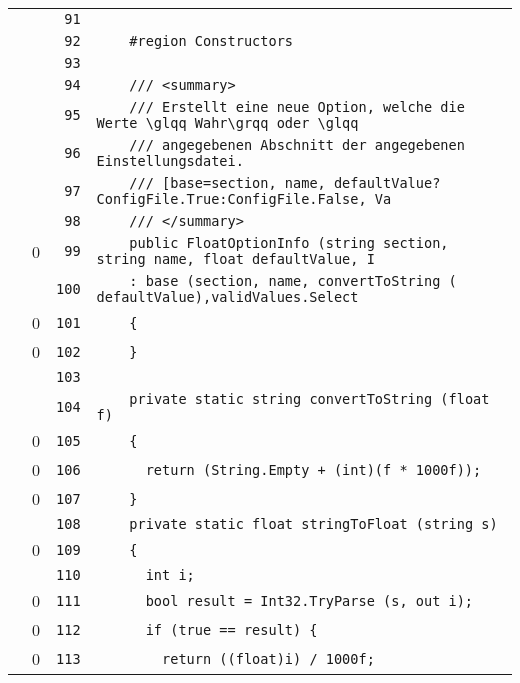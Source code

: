 \documentclass[a4paper,10pt]{article}
\begin{document}
\begin{longtable}[l]{lrrl}
\cellcolor{gray} &  & \verb~91~ & \verb~~\\
\cellcolor{gray} &  & \verb~92~ & \verb~    #region Constructors~\\
\cellcolor{gray} &  & \verb~93~ & \verb~~\\
\cellcolor{gray} &  & \verb~94~ & \verb~    /// <summary>~\\
\cellcolor{gray} &  & \verb~95~ & \verb~    /// Erstellt eine neue Option, welche die Werte \glqq Wahr\grqq oder \glqq~\\
\cellcolor{gray} &  & \verb~96~ & \verb~    /// angegebenen Abschnitt der angegebenen Einstellungsdatei.~\\
\cellcolor{gray} &  & \verb~97~ & \verb~    /// [base=section, name, defaultValue?ConfigFile.True:ConfigFile.False, Va~\\
\cellcolor{gray} &  & \verb~98~ & \verb~    /// </summary>~\\
\cellcolor{red} & 0 & \verb~99~ & \verb~    public FloatOptionInfo (string section, string name, float defaultValue, I~\\
\cellcolor{gray} &  & \verb~100~ & \verb~    : base (section, name, convertToString ( defaultValue),validValues.Select ~\\
\cellcolor{red} & 0 & \verb~101~ & \verb~    {~\\
\cellcolor{red} & 0 & \verb~102~ & \verb~    }~\\
\cellcolor{gray} &  & \verb~103~ & \verb~~\\
\cellcolor{gray} &  & \verb~104~ & \verb~    private static string convertToString (float f)~\\
\cellcolor{red} & 0 & \verb~105~ & \verb~    {~\\
\cellcolor{red} & 0 & \verb~106~ & \verb~      return (String.Empty + (int)(f * 1000f));~\\
\cellcolor{red} & 0 & \verb~107~ & \verb~    }~\\
\cellcolor{gray} &  & \verb~108~ & \verb~    private static float stringToFloat (string s)~\\
\cellcolor{red} & 0 & \verb~109~ & \verb~    {~\\
\cellcolor{gray} &  & \verb~110~ & \verb~      int i;~\\
\cellcolor{red} & 0 & \verb~111~ & \verb~      bool result = Int32.TryParse (s, out i);~\\
\cellcolor{red} & 0 & \verb~112~ & \verb~      if (true == result) {~\\
\cellcolor{red} & 0 & \verb~113~ & \verb~        return ((float)i) / 1000f;~\\

\end{longtable}
\end{document}
